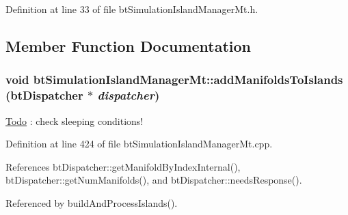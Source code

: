 Definition at line 33 of file btSimulationIslandManagerMt.h.

\subsection{Member Function Documentation}
\hypertarget{classbt_simulation_island_manager_mt_77eadf262f5a0e63053e3efcc9ccfec9}{
\subsubsection[addManifoldsToIslands]{\setlength{\rightskip}{0pt plus 5cm}void btSimulationIslandManagerMt::addManifoldsToIslands ({\bf btDispatcher} $\ast$ {\em dispatcher})}}
\label{classbt_simulation_island_manager_mt_77eadf262f5a0e63053e3efcc9ccfec9}




\begin{Desc}
\item[\hyperlink{todo__todo000035}{Todo}]: check sleeping conditions! \end{Desc}


Definition at line 424 of file btSimulationIslandManagerMt.cpp.

References btDispatcher::getManifoldByIndexInternal(), btDispatcher::getNumManifolds(), and btDispatcher::needsResponse().

Referenced by buildAndProcessIslands().

